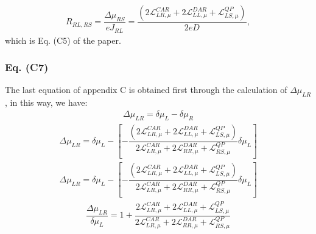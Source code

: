 \begin{align}\label{RRLRS:def}
R_{RL,RS}
=
\dfrac{\Delta\mu_{RS}}{eJ_{RL}}
=
\dfrac{(2\mathcal{L}_{LR,\mu}^{CAR}+
2\mathcal{L}_{LL,\mu}^{DAR}+
\mathcal{L}^{QP}_{LS,\mu})}{2eD},
\end{align}
which is Eq. (C5) of the paper.

\subsubsection{Eq. (C7)}

The last equation of appendix C is obtained first through the calculation of $\Delta\mu_{LR}$, in this way, we have:
\begin{align*}
\Delta\mu_{LR}=\delta\mu_{L}-\delta\mu_{R}
\end{align*}
\begin{align*}
\Delta\mu_{LR}=\delta\mu_{L}-\left[-\dfrac{(2\mathcal{L}_{LR,\mu}^{CAR}+
2\mathcal{L}_{LL,\mu}^{DAR}+
\mathcal{L}^{QP}_{LS,\mu})}{2\mathcal{L}_{LR,\mu}^{CAR}
+
2\mathcal{L}_{RR,\mu}^{DAR}
+
\mathcal{L}^{QP}_{RS,\mu}}\delta\mu_{L}\right]
\end{align*}
\begin{align*}
\Delta\mu_{LR}=\delta\mu_{L}-\left[-\dfrac{(2\mathcal{L}_{LR,\mu}^{CAR}+
2\mathcal{L}_{LL,\mu}^{DAR}+
\mathcal{L}^{QP}_{LS,\mu})}{2\mathcal{L}_{LR,\mu}^{CAR}
+
2\mathcal{L}_{RR,\mu}^{DAR}
+
\mathcal{L}^{QP}_{RS,\mu}}\delta\mu_{L}\right]
\end{align*}
\begin{align*}
\dfrac{\Delta\mu_{LR}}{\delta\mu_{L}}=1+\dfrac{2\mathcal{L}_{LR,\mu}^{CAR}+
2\mathcal{L}_{LL,\mu}^{DAR}+
\mathcal{L}^{QP}_{LS,\mu}}{2\mathcal{L}_{LR,\mu}^{CAR}
+
2\mathcal{L}_{RR,\mu}^{DAR}
+
\mathcal{L}^{QP}_{RS,\mu}}
\end{align*}

